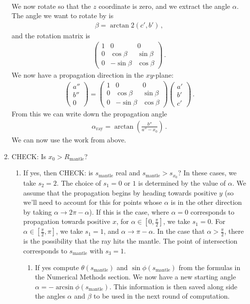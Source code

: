\documentclass{article}
\newcommand*\te[1]{\text{#1}}
\newcommand*\p[1]{\left(#1\right)}
\newcommand*\f[2]{\frac{#1}{#2}}
\newcommand*\mat[2]{\left(\begin{array}{#1}#2\end{array}\right)}
\begin{document}
\begin{enumerate}
\begin{align}
\end{align}
We now rotate so that the $z$ coordinate is zero, and we extract the angle $\alpha$. The angle we want to rotate by is
\begin{align}
\beta=\arctan2\p{c',b'}\,,
\end{align}
and the rotation matrix is
\begin{align}
\mat{ccc}{1&0&0\\0&\cos\beta&\sin\beta\\0&-\sin\beta&\cos\beta}\,.
\end{align}
We now have a propagation direction in the $xy$-plane:
\begin{align}
\mat{c}{a''\\b''\\0}=\mat{ccc}{1&0&0\\0&\cos\beta&\sin\beta\\0&-\sin\beta&\cos\beta}\mat{c}{a'\\b'\\c'}\,.
\end{align}
From this we can write down the propagation angle
\begin{align}
\alpha_{\te{ray}}=\arctan\p{\f{b''}{a''-x_0}}\,.
\end{align}
We can now use the work from above. 
\item CHECK: Is $x_0>R_{\te{mantle}}$?
\begin{enumerate}
\item If yes, then CHECK: is $s_{\te{mantle}}$ real and $s_{\te{mantle}}>s_{x_0}$? In these cases, we take $s_2=2$. The choice of $s_1=0$ or $1$ is determined by the value of $\alpha$. We assume that the propagation begins by heading towards positive $y$ (so we'll need to account for this for points whose $\alpha$ is in the other direction by taking $\alpha\to2\pi-\alpha$). If this is the case, where $\alpha=0$ corresponds to propagation towards positive $x$, for $\alpha\in[0,\f\pi2]$, we take $s_1=0$. For $\alpha\in[\f\pi2,\pi]$, we take $s_1=1$, and $\alpha\to\pi-\alpha$. In the case that $\alpha>\f\pi2$, there is the possibility that the ray hits the mantle. The point of intersection corresponds to $s_{\te{mantle}}$ with $s_3=1$.
\begin{enumerate}
\item If yes compute $\theta(s_{\te{mantle}})$ and $\sin\phi(s_{\te{mantle}})$ from the formulas in the Numerical Methods section. We now have a new starting angle $\alpha=-\arcsin\phi(s_{\te{mantle}})$. This information is then saved along side the angles $\alpha$ and $\beta$ to be used in the next round of computation.

\end{enumerate}
\end{enumerate}
\end{enumerate}
\end{document}
